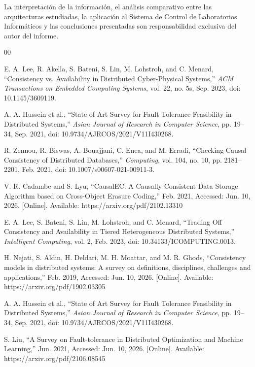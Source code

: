 \documentclass[10pt,conference]{IEEEtran}
\begin{document}
La interpretación de la información, el análisis comparativo entre las arquitecturas estudiadas, la aplicación al Sistema de Control de Laboratorios Informáticos y las conclusiones presentadas son responsabilidad exclusiva del autor del informe.



\begin{thebibliography}{00}

 E. A. Lee, R. Akella, S. Bateni, S. Lin, M. Lohstroh, and C. Menard, ``Consistency vs. Availability in Distributed Cyber-Physical Systems,'' \textit{ACM Transactions on Embedded Computing Systems}, vol. 22, no. 5s, Sep. 2023, doi: 10.1145/3609119.

 A. A. Hussein et al., ``State of Art Survey for Fault Tolerance Feasibility in Distributed Systems,'' \textit{Asian Journal of Research in Computer Science}, pp. 19--34, Sep. 2021, doi: 10.9734/AJRCOS/2021/V11I430268.

 R. Zennou, R. Biswas, A. Bouajjani, C. Enea, and M. Erradi, ``Checking Causal Consistency of Distributed Databases,'' \textit{Computing}, vol. 104, no. 10, pp. 2181--2201, Feb. 2021, doi: 10.1007/s00607-021-00911-3.

 V. R. Cadambe and S. Lyu, ``CausalEC: A Causally Consistent Data Storage Algorithm based on Cross-Object Erasure Coding,'' Feb. 2021, Accessed: Jun. 10, 2026. [Online]. Available: https://arxiv.org/pdf/2102.13310

 E. A. Lee, S. Bateni, S. Lin, M. Lohstroh, and C. Menard, ``Trading Off Consistency and Availability in Tiered Heterogeneous Distributed Systems,'' \textit{Intelligent Computing}, vol. 2, Feb. 2023, doi: 10.34133/ICOMPUTING.0013.

 H. Nejati, S. Aldin, H. Deldari, M. H. Moattar, and M. R. Ghods, ``Consistency models in distributed systems: A survey on definitions, disciplines, challenges and applications,'' Feb. 2019, Accessed: Jun. 10, 2026. [Online]. Available: https://arxiv.org/pdf/1902.03305

 A. A. Hussein et al., ``State of Art Survey for Fault Tolerance Feasibility in Distributed Systems,'' \textit{Asian Journal of Research in Computer Science}, pp. 19--34, Sep. 2021, doi: 10.9734/AJRCOS/2021/V11I430268.

 S. Liu, ``A Survey on Fault-tolerance in Distributed Optimization and Machine Learning,'' Jun. 2021, Accessed: Jun. 10, 2026. [Online]. Available: https://arxiv.org/pdf/2106.08545


\end{thebibliography}
\end{document}
